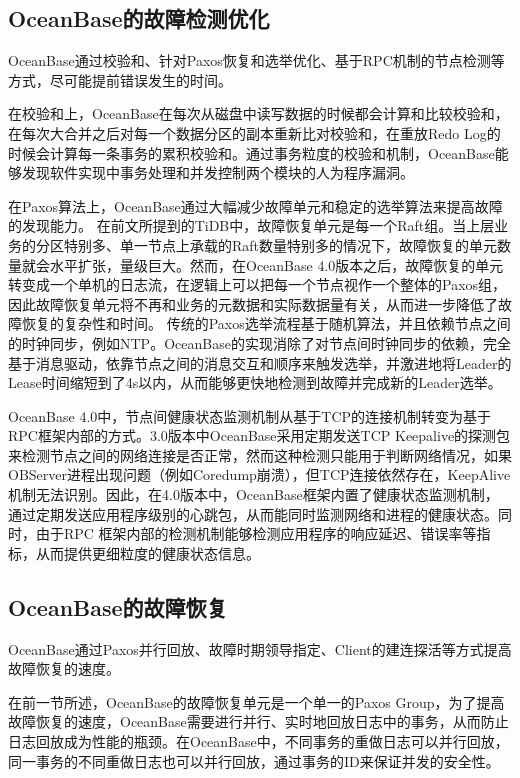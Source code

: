 \subsection{OceanBase的故障检测优化}

OceanBase通过校验和、针对Paxos恢复和选举优化、基于RPC机制的节点检测等方式，尽可能提前错误发生的时间。

在校验和上，OceanBase在每次从磁盘中读写数据的时候都会计算和比较校验和，在每次大合并之后对每一个数据分区的副本重新比对校验和，在重放Redo Log的时候会计算每一条事务的累积校验和。通过事务粒度的校验和机制，OceanBase能够发现软件实现中事务处理和并发控制两个模块的人为程序漏洞。

在Paxos算法上，OceanBase通过大幅减少故障单元和稳定的选举算法来提高故障的发现能力。
在前文所提到的TiDB中，故障恢复单元是每一个Raft组。当上层业务的分区特别多、单一节点上承载的Raft数量特别多的情况下，故障恢复的单元数量就会水平扩张，量级巨大。然而，在OceanBase 4.0版本之后，故障恢复的单元转变成一个单机的日志流，在逻辑上可以把每一个节点视作一个整体的Paxos组，因此故障恢复单元将不再和业务的元数据和实际数据量有关，从而进一步降低了故障恢复的复杂性和时间。
传统的Paxos选举流程基于随机算法，并且依赖节点之间的时钟同步，例如NTP。OceanBase的实现消除了对节点间时钟同步的依赖，完全基于消息驱动，依靠节点之间的消息交互和顺序来触发选举，并激进地将Leader的Lease时间缩短到了4s以内，从而能够更快地检测到故障并完成新的Leader选举。

OceanBase 4.0中，节点间健康状态监测机制从基于TCP的连接机制转变为基于RPC框架内部的方式。3.0版本中OceanBase采用定期发送TCP Keepalive的探测包来检测节点之间的网络连接是否正常，然而这种检测只能用于判断网络情况，如果OBServer进程出现问题（例如Coredump崩溃），但TCP连接依然存在，KeepAlive机制无法识别。因此，在4.0版本中，OceanBase框架内置了健康状态监测机制，通过定期发送应用程序级别的心跳包，从而能同时监测网络和进程的健康状态。同时，由于RPC 框架内部的检测机制能够检测应用程序的响应延迟、错误率等指标，从而提供更细粒度的健康状态信息。

\subsection{OceanBase的故障恢复}

OceanBase通过Paxos并行回放、故障时期领导指定、Client的建连探活等方式提高故障恢复的速度。

在前一节所述，OceanBase的故障恢复单元是一个单一的Paxos Group，为了提高故障恢复的速度，OceanBase需要进行并行、实时地回放日志中的事务，从而防止日志回放成为性能的瓶颈。在OceanBase中，不同事务的重做日志可以并行回放，同一事务的不同重做日志也可以并行回放，通过事务的ID来保证并发的安全性。

